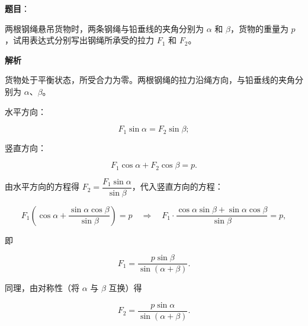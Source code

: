 \begin{answer}

\textbf{题目}：

两根钢绳悬吊货物时，两条钢绳与铅垂线的夹角分别为 $\alpha$ 和 $\beta$，货物的重量为 $p$，试用表达式分别写出钢绳所承受的拉力 $F_1$ 和 $F_2$。

\textbf{解析}

货物处于平衡状态，所受合力为零。两根钢绳的拉力沿绳方向，与铅垂线的夹角分别为 $\alpha$、$\beta$。

水平方向：

\nopagebreak[4]
\[
F_{1}\sin\alpha=F_{2}\sin\beta;
\]

竖直方向：

\nopagebreak[4]
\[
F_{1}\cos\alpha+F_{2}\cos\beta=p.
\]

由水平方向的方程得 $F_{2}=\dfrac{F_{1}\sin\alpha}{\sin\beta}$，代入竖直方向的方程：

\nopagebreak[4]
\[
F_{1}\left(\cos\alpha+\frac{\sin\alpha\cos\beta}{\sin\beta}\right)=p
\quad\Longrightarrow\quad
F_{1}\cdot\frac{\cos\alpha\sin\beta+\sin\alpha\cos\beta}{\sin\beta}=p,
\]

即

\nopagebreak[4]
\[
F_{1}=\frac{p\sin\beta}{\sin(\alpha+\beta)}.
\]

同理，由对称性（将 $\alpha$ 与 $\beta$ 互换）得

\nopagebreak[4]
\[
F_{2}=\frac{p\sin\alpha}{\sin(\alpha+\beta)}.
\]


\end{answer}